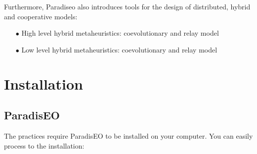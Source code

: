 \documentclass[a4paper]{article}
\begin{document}
    \smallskip
    Furthermore, Paradiseo also introduces tools for the design of distributed, hybrid and cooperative models:
    \begin{itemize}
           \item[$\bullet$] High level hybrid metaheuristics: coevolutionary and relay model
           \item[$\bullet$] Low level hybrid metaheuristics: coevolutionary and relay model
    \end{itemize}



\section{Installation}

\subsection{ParadisEO}

    The practices require ParadisEO to be installed on your
    computer. You can easily process to the installation:
\end{document}
